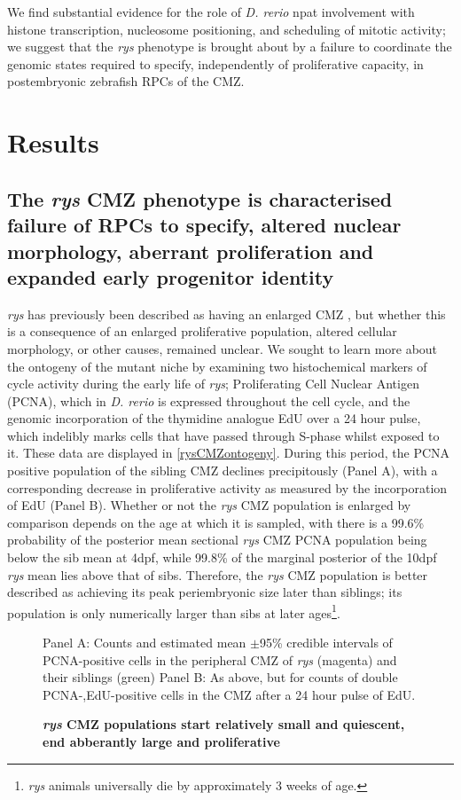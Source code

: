 We find substantial evidence for the role of \textit{D. rerio} npat involvement with histone transcription, nucleosome positioning, and scheduling of mitotic activity; we suggest that the \textit{rys} phenotype is brought about by a failure to coordinate the genomic states required to specify, independently of proliferative capacity, in postembryonic zebrafish RPCs of the CMZ.

\section{Results}
\subsection{The \textit{rys} CMZ phenotype is characterised failure of RPCs to specify, altered nuclear morphology, aberrant proliferation and expanded early progenitor identity}

\textit{rys} has previously been described as having an enlarged CMZ \cite{Wehman2005}, but whether this is a consequence of an enlarged proliferative population, altered cellular morphology, or other causes, remained unclear. We sought to learn more about the ontogeny of the mutant niche by examining two histochemical markers of cycle activity during the early life of \textit{rys}; Proliferating Cell Nuclear Antigen (PCNA), which in \textit{D. rerio} is expressed throughout the cell cycle, and the genomic incorporation of the thymidine analogue EdU over a 24 hour pulse, which indelibly marks cells that have passed through S-phase whilst exposed to it. These data are displayed in \autoref{rysCMZontogeny}. During this period, the PCNA positive population of the sibling CMZ declines precipitously (Panel A), with a corresponding decrease in proliferative activity as measured by the incorporation of EdU (Panel B). Whether or not the \textit{rys} CMZ population is enlarged by comparison depends on the age at which it is sampled, with there is a 99.6\% probability of the posterior mean sectional \textit{rys} CMZ PCNA population being below the sib mean at 4dpf, while 99.8\% of the marginal posterior of the 10dpf \textit{rys} mean lies above that of sibs. Therefore, the \textit{rys} CMZ population is better described as achieving its peak periembryonic size later than siblings; its population is only numerically larger than sibs at later ages\footnote{\textit{rys} animals universally die by approximately 3 weeks of age.}. 

\begin{figure}[!h]
    \caption{{\bf \textit{rys} CMZ populations start relatively small and quiescent, end abberantly large and proliferative}}
    Panel A: Counts and estimated mean $\pm$95\% credible intervals of PCNA-positive cells in the peripheral CMZ of \textit{rys} (magenta) and their siblings (green)
    Panel B: As above, but for counts of double PCNA-,EdU-positive cells in the CMZ after a 24 hour pulse of EdU.
    \label{rysCMZontogeny}

\end{figure}
\FloatBarrier

